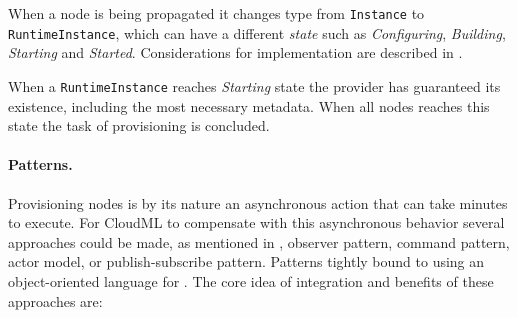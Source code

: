 When a node is being propagated it changes type from \texttt{Instance} to 
\texttt{RuntimeInstance}, which can have a different \emph{state} such as 
\emph{Configuring}, \emph{Building}, \emph{Starting} and \emph{Started}.
Considerations for implementation are described in .

When a \texttt{RuntimeInstance} reaches \emph{Starting} state the provider 
has guaranteed its existence, including the most necessary metadata.
When all nodes reaches this state the task of provisioning is concluded.

\paragraph{Patterns.}

Provisioning nodes is by its nature an asynchronous action that can take minutes to execute.
For CloudML to compensate with this asynchronous behavior several approaches could be made,
as mentioned in , \ie observer pattern, command pattern, actor model,
or publish-subscribe pattern.
Patterns tightly bound to using an object-oriented language for .
The core idea of integration and benefits of these approaches are:
